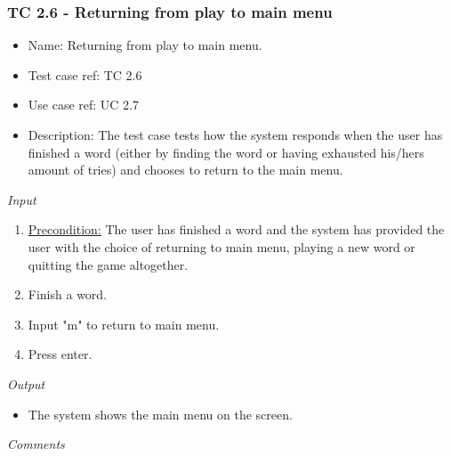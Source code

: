 \documentclass[12pt, letterpaper]{article}
\begin{document}
\subsubsection{TC 2.6 - Returning from play to main menu}
\begin{itemize}
	\item Name: Returning from play to main menu.
	\item Test case ref: TC 2.6
	\item Use case ref: UC 2.7
	\item Description: The test case tests how the system responds when the user has finished a word (either by finding the word or having exhausted his/hers amount of tries) and chooses to return to the main menu.
\end{itemize}
\emph{Input}
\begin{enumerate}
	\item \underline{Precondition:} The user has finished a word and the system has provided the user with the choice of returning to main menu, playing a new word or quitting the game altogether.
	\item Finish a word.
	\item Input "m" to return to main menu.
	\item Press enter.
\end{enumerate}
\emph{Output}
\begin{itemize}
	\item The system shows the main menu on the screen.
\end{itemize}
\emph{Comments}
\newline
\newline
\newline
\newline
\newline
\newline
\newline
\end{document}
